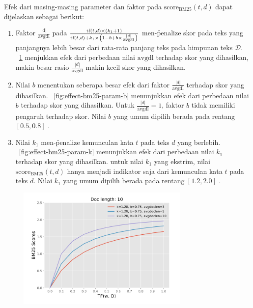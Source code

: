      Efek dari masing-masing parameter dan faktor pada $\text{score}_{\text{BM25}}(t,d)$ dapat dijelaskan sebagai berikut:
    \begin{enumerate}
        \item Faktor $\frac{|\text{d}|}{\text{avgdl}}$ pada $\frac{\text{tf}(t, d) \times (k_1 + 1)}{\text{tf}(t, d) + k_1 \times \left(1 - b + b \times \textcolor{black}{\frac{|d|}{\text{avgdl}}}\right)}$ men-\f{penalize} skor pada teks yang panjangnya lebih besar dari rata-rata panjang teks pada himpunan teks $\mathcal{D}$. \pic~\ref{fig:effect-bm25-long-doc} menjukkan efek dari perbedaan nilai $\text{avgdl}$ terhadap skor yang dihasilkan, makin besar rasio $\frac{|d|}{\text{avgdl}}$ makin kecil skor yang dihasilkan.
        \item Nilai $b$ menentukan seberapa besar efek dari faktor $\frac{|d|}{\text{avgdl}}$ terhadap skor yang dihasilkan. \pic~\ref{fig:effect-bm25-param-b} menunjukkan efek dari perbedaan nilai $b$ terhadap skor yang dihasilkan. Untuk $\frac{|d|}{\text{avgdl}}=1$, faktor $b$ tidak memiliki pengaruh terhadap skor. Nilai $b$ yang umum dipilih berada pada rentang $[0.5, 0.8]$ \citep{irlecture}.
        \item  Nilai $k_1$ men-\f{penalize} kemunculan kata $t$ pada teks $d$ yang berlebih. \pic~\ref{fig:effect-bm25-param-k} menunjukkan efek dari perbedaan nilai $k_1$ terhadap skor yang dihasilkan. untuk nilai $k_1$ yang ekstrim, nilai $\text{score}_{\text{BM25}}(t,d)$ hanya menjadi indikator saja dari kemunculan kata $t$ pada teks $d$. Nilai $k_1$ yang umum dipilih berada pada rentang $[1.2, 2.0]$ \citep{irlecture}.
    \end{enumerate}
    \begin{figure}[!ht]
        \centering
        \includegraphics[width=0.75\textwidth]{assets/pics/effect-bm25-long-doc.png}
        \label{fig:effect-bm25-long-doc}
    \end{figure}

